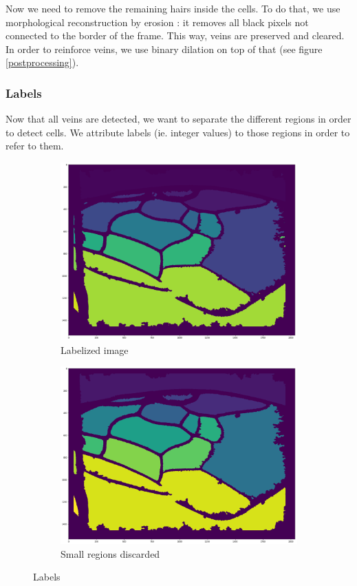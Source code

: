 \documentclass[a4paper]{article}
\begin{document}
Now we need to remove the remaining hairs inside the cells. To do that, we use morphological reconstruction by erosion : it removes all black pixels not connected to the border of the frame. This way, veins are preserved and cleared. In order to reinforce veins, we use binary dilation on top of that (see figure \ref{postprocessing}).

\subsubsection{Labels}
Now that all veins are detected, we want to separate the different regions in order to detect cells. We attribute labels (ie. integer values) to those regions in order to refer to them.

\begin{figure}[H]

    \begin{subfigure}[t]{.5\textwidth}
    \centering
    \includegraphics[width=\textwidth]{figures/markers1.png}
    \caption{Labelized image}
\end{subfigure}
    \begin{subfigure}[t]{.5\textwidth}
    \centering
    \includegraphics[width=\textwidth]{figures/markers2.png}
    \caption{Small regions discarded}
\end{subfigure}
\caption{Labels}
\label{labels}
\end{figure}
\end{document}
